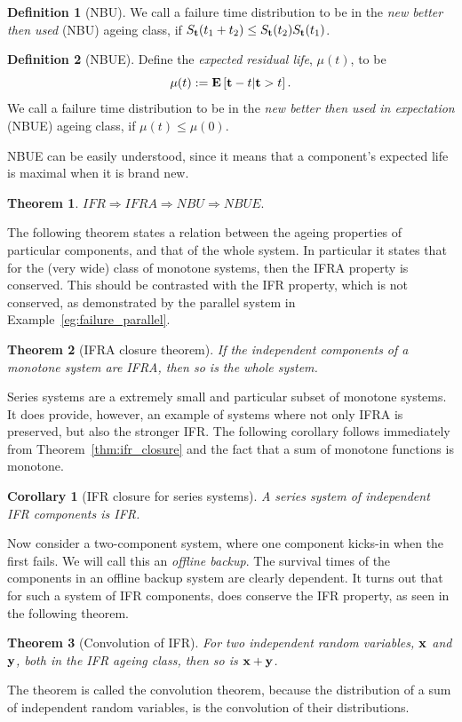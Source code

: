 \documentclass[12pt,a4paper]{report}
\theoremstyle{plain}
\newtheorem{theorem}{Theorem}[section]
\newtheorem{cor}{Corollary}[section]
\theoremstyle{definition}
\newtheorem{definition}{Definition}
\begin{document}
\begin{definition}[NBU]
We call a failure time distribution to be in the \emph{new better then used} (NBU) ageing class, if 
$S_{\mathbf{t}} (t_1+t_2) \leq S_{\mathbf{t}} (t_2) S_{\mathbf{t}} (t_1)$.
\end{definition}


\begin{definition}[NBUE]
Define the \emph{expected residual life}, $\mu(t)$, to be 
$$\mu(t):= \mathbf{E}\left[ \mathbf{t}-t|\mathbf{t}>t \right].$$
We call a failure time distribution to be in the \emph{new better then used in expectation} (NBUE) ageing class, if 
$\mu(t) \leq \mu(0)$.
\end{definition}
NBUE can be easily understood, since it means that a component's expected life is maximal when it is brand new. 


\begin{theorem}
$IFR \Rightarrow IFRA \Rightarrow NBU \Rightarrow NBUE. $
\end{theorem}


The following theorem states a relation between the ageing properties of particular components, and that of the whole system. In particular it states that for the (very wide) class of monotone systems, then the IFRA property is conserved. 
This should be contrasted with the IFR property, which is not conserved, as demonstrated by the parallel system in  Example~\ref{eg:failure_parallel}.
\begin{theorem}[IFRA closure theorem]
\label{thm:ifra_closure}
If the independent components of a monotone system are IFRA, then so is the whole system.
\end{theorem}


Series systems are a extremely small and particular subset of monotone systems.
It does provide, however, an example of systems where not only IFRA is preserved, but also the stronger IFR.
The following corollary follows immediately from Theorem~\ref{thm:ifr_closure} and the fact that a sum of monotone functions is monotone.
\begin{cor}[IFR closure for series systems]
\label{cor:ifr_series}
A series system of independent IFR components is IFR.
\end{cor}




Now consider a two-component system, where one component kicks-in when the first fails.
We will call this an \emph{offline backup}.
The survival times of the components in an offline backup system are clearly dependent. 
It turns out that for such a system of IFR components, does conserve the IFR property, as seen in the following theorem.
\begin{theorem}[Convolution of IFR]
\label{thm:ifr_convolution}
For two independent random variables, $\mathbf{x}$ and $\mathbf{y}$, both in the IFR ageing class, then so is $\mathbf{x}+\mathbf{y}$.
\end{theorem}
The theorem is called the convolution theorem, because the distribution of a sum of independent random variables, is the convolution of their distributions.
\end{document}
